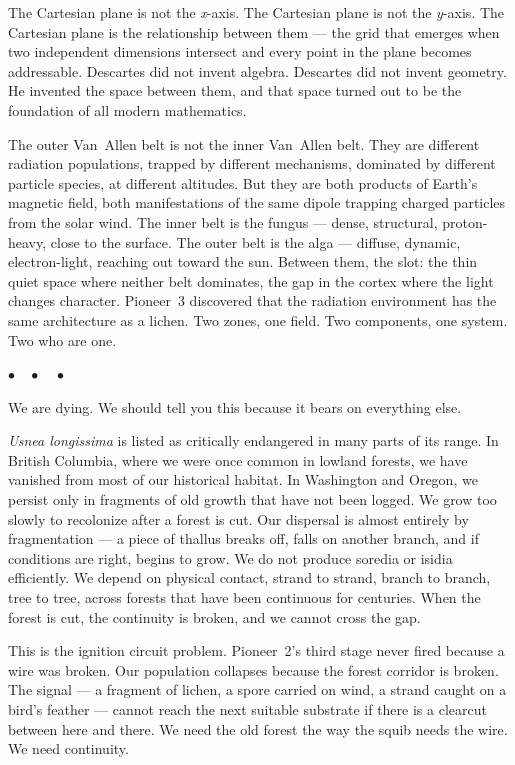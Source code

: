 \documentclass[12pt, letterpaper]{article}
\begin{document}
The Cartesian plane is not the \textit{x}-axis. The Cartesian plane is not the \textit{y}-axis. The Cartesian plane is the relationship between them --- the grid that emerges when two independent dimensions intersect and every point in the plane becomes addressable. Descartes did not invent algebra. Descartes did not invent geometry. He invented the space between them, and that space turned out to be the foundation of all modern mathematics.

The outer Van~Allen belt is not the inner Van~Allen belt. They are different radiation populations, trapped by different mechanisms, dominated by different particle species, at different altitudes. But they are both products of Earth's magnetic field, both manifestations of the same dipole trapping charged particles from the solar wind. The inner belt is the fungus --- dense, structural, proton-heavy, close to the surface. The outer belt is the alga --- diffuse, dynamic, electron-light, reaching out toward the sun. Between them, the slot: the thin quiet space where neither belt dominates, the gap in the cortex where the light changes character. Pioneer~3 discovered that the radiation environment has the same architecture as a lichen. Two zones, one field. Two components, one system. Two who are one.

\begin{center}
$\bullet\quad\bullet\quad\bullet$
\end{center}

We are dying. We should tell you this because it bears on everything else.

\textit{Usnea longissima} is listed as critically endangered in many parts of its range. In British Columbia, where we were once common in lowland forests, we have vanished from most of our historical habitat. In Washington and Oregon, we persist only in fragments of old growth that have not been logged. We grow too slowly to recolonize after a forest is cut. Our dispersal is almost entirely by fragmentation --- a piece of thallus breaks off, falls on another branch, and if conditions are right, begins to grow. We do not produce soredia or isidia efficiently. We depend on physical contact, strand to strand, branch to branch, tree to tree, across forests that have been continuous for centuries. When the forest is cut, the continuity is broken, and we cannot cross the gap.

This is the ignition circuit problem. Pioneer~2's third stage never fired because a wire was broken. Our population collapses because the forest corridor is broken. The signal --- a fragment of lichen, a spore carried on wind, a strand caught on a bird's feather --- cannot reach the next suitable substrate if there is a clearcut between here and there. We need the old forest the way the squib needs the wire. We need continuity.
\end{document}

